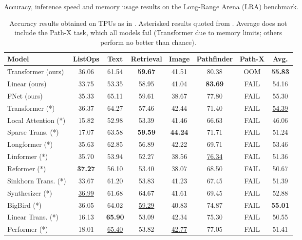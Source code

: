 \documentclass[11pt]{article}
\begin{document}
\begin{table*}[tb]
    \caption{Accuracy, inference speed and memory usage results on the Long-Range Arena (LRA) benchmark.}
    \label{tab:lra}
    \begin{subtable}[t]{\textwidth}
    \centering
    \begin{tabular}{l | c c c c c c | c}
        \hline
         Model & ListOps & Text & Retrieval & Image & Pathfinder & Path-X & Avg.  \\ \hline \hline
         Transformer (ours) & {36.06} & 61.54 & \textbf{59.67} & {41.51} & 80.38 & OOM & \textbf{55.83}  \\ 
         Linear (ours) & 33.75 & 53.35 & 58.95 & 41.04 & \textbf{83.69} & FAIL & 54.16 \\
         FNet (ours) & 35.33 & {65.11} & 59.61 & 38.67 & 77.80 & FAIL & 55.30  \\ \hline
         Transformer (*) & 36.37 & 64.27 & 57.46 & 42.44 & 71.40 & FAIL & \underline{54.39} \\
         Local Attention (*) & 15.82 & 52.98 & 53.39 & 41.46 & 66.63 & FAIL & 46.06 \\
         Sparse Trans. (*) & 17.07 & 63.58 & \textbf{59.59} & \textbf{44.24} & 71.71 & FAIL & 51.24 \\
         Longformer (*) & 35.63 & 62.85 & 56.89 & 42.22 & 69.71 & FAIL & 53.46 \\
         Linformer (*) & 35.70 & 53.94 & 52.27 & 38.56 & \underline{76.34} & FAIL & 51.36 \\
         Reformer (*) & \textbf{37.27} & 56.10  & 53.40 & 38.07 & 68.50 & FAIL & 50.67 \\
         Sinkhorn Trans. (*) & 33.67 & 61.20 & 53.83 & 41.23 & 67.45 & FAIL & 51.39 \\
         Synthesizer (*) & \underline{36.99} & 61.68 & 64.67 & 41.61 & 69.45 & FAIL & 52.88 \\
         BigBird (*) & 36.05 & 64.02 & \underline{59.29} & 40.83 & 74.87 & FAIL & \textbf{55.01} \\
         Linear Trans. (*) & 16.13 & \textbf{65.90} & 53.09 & 42.34 & 75.30 & FAIL & 50.55 \\
         Performer (*) & 18.01 & \underline{65.40} & 53.82 & \underline{42.77} & 77.05 & FAIL & 51.41  \\ \hline
    \end{tabular}
    \caption{Accuracy results obtained on TPUs as in \citet{tay2020long}. Asterisked results quoted from \citet{tay2020long}. Average does not include the Path-X task, which all models fail (Transformer due to memory limits; others perform no better than chance).}

\end{subtable}
\end{table*}
\end{document}
